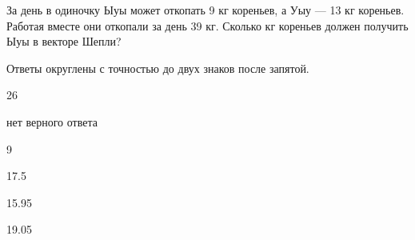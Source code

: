 
\begin{question}
За день в одиночку Ыуы может откопать 9 кг кореньев, а Уыу --- 13 кг
кореньев. Работая вместе они откопали за день 39 кг. Сколько кг кореньев
должен получить Ыуы в векторе Шепли?

Ответы округлены с точностью до двух знаков после запятой.
\begin{answerlist}
  \item 26
  \item нет верного ответа
  \item 9
  \item 17.5
  \item 15.95
  \item 19.05
\end{answerlist}
\end{question}



